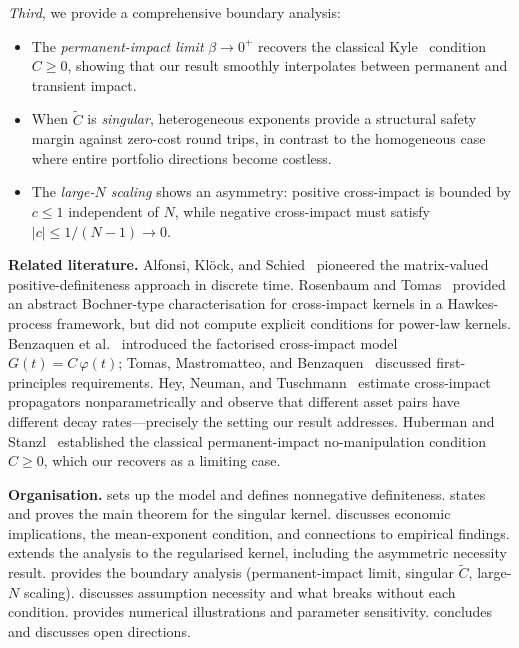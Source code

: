 \documentclass[12pt]{article}
\theoremstyle{definition}
\theoremstyle{remark}
\newcommand{\bC}{\widetilde{C}}
\begin{document}
\emph{Third}, we provide a comprehensive boundary analysis:
\begin{itemize}[nosep]
\item The \emph{permanent-impact limit} $\beta\to 0^+$ recovers the classical
  Kyle~\cite{Kyle1985} condition $C\ge 0$, showing that our result
  smoothly interpolates between permanent and transient impact.
\item When $\bC$ is \emph{singular}, heterogeneous exponents provide a structural
  safety margin against zero-cost round trips, in contrast to the homogeneous case
  where entire portfolio directions become costless.
\item The \emph{large-$N$ scaling} shows an asymmetry: positive cross-impact
  is bounded by $c\le 1$ independent of $N$, while negative cross-impact
  must satisfy $|c| \le 1/(N-1) \to 0$.
\end{itemize}

\medskip
\noindent\textbf{Related literature.}
Alfonsi, Kl\"ock, and Schied~\cite{AlfonsiKlockSchied2016} pioneered the matrix-valued
positive-definiteness approach in discrete time.
Rosenbaum and Tomas~\cite{RosenbaumTomas2021} provided an abstract Bochner-type
characterisation for cross-impact kernels in a Hawkes-process framework, but did not
compute explicit conditions for power-law kernels.
Benzaquen et al.~\cite{BMEB2017} introduced the factorised cross-impact model
$G(t) = C\,\varphi(t)$; Tomas, Mastromatteo, and Benzaquen~\cite{TMB2022} discussed
first-principles requirements.
Hey, Neuman, and Tuschmann~\cite{HeyNeumanTuschmann2025} estimate cross-impact
propagators nonparametrically and observe that different asset pairs have different
decay rates---precisely the setting our result addresses.
Huberman and Stanzl~\cite{HubermanStanzl2004} established the classical
permanent-impact no-manipulation condition $C\ge 0$, which our
 recovers as a limiting case.

\medskip
\noindent\textbf{Organisation.}
 sets up the model and defines nonnegative definiteness.
 states and proves the main theorem for the singular kernel.
 discusses economic implications, the mean-exponent condition,
and connections to empirical findings.
 extends the analysis to the regularised kernel, including
the asymmetric necessity result.
 provides the boundary analysis (permanent-impact limit,
singular $\bC$, large-$N$ scaling).
 discusses assumption necessity and what breaks without
each condition.
 provides numerical illustrations and parameter sensitivity.
 concludes and discusses open directions.
\end{document}
